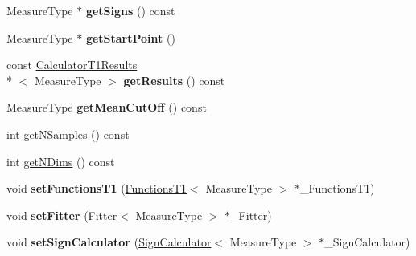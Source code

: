 \begin{DoxyCompactItemize}
\item 
\hypertarget{class_ox_1_1_calculator_t1_a1fb7d7a8ab324b807447a5757d8e20f9}{Measure\-Type $\ast$ {\bfseries get\-Signs} () const }\label{class_ox_1_1_calculator_t1_a1fb7d7a8ab324b807447a5757d8e20f9}

\item 
\hypertarget{class_ox_1_1_calculator_t1_a4d430a63b313f8ae1197a27842e87d47}{Measure\-Type $\ast$ {\bfseries get\-Start\-Point} ()}\label{class_ox_1_1_calculator_t1_a4d430a63b313f8ae1197a27842e87d47}

\item 
\hypertarget{class_ox_1_1_calculator_t1_a55406cd104fb7d67925ece789161e2c9}{const \hyperlink{struct_ox_1_1_calculator_t1_results}{Calculator\-T1\-Results}\\*
$<$ Measure\-Type $>$ {\bfseries get\-Results} () const }\label{class_ox_1_1_calculator_t1_a55406cd104fb7d67925ece789161e2c9}

\item 
\hypertarget{class_ox_1_1_calculator_t1_a3b66db06485b8031bcface5524d8c081}{Measure\-Type {\bfseries get\-Mean\-Cut\-Off} () const }\label{class_ox_1_1_calculator_t1_a3b66db06485b8031bcface5524d8c081}

\item 
int \hyperlink{class_ox_1_1_calculator_t1_a8a11b3b6c0dcbc461c11dc55600d7992}{get\-N\-Samples} () const 
\item 
int \hyperlink{class_ox_1_1_calculator_t1_a7523942a79b9ee44b2b5d81d5836b54d}{get\-N\-Dims} () const 
\item 
\hypertarget{class_ox_1_1_calculator_t1_a88e23f6ffa2903dc14a6133a90203f02}{void {\bfseries set\-Functions\-T1} (\hyperlink{class_ox_1_1_functions_t1}{Functions\-T1}$<$ Measure\-Type $>$ $\ast$\-\_\-\-Functions\-T1)}\label{class_ox_1_1_calculator_t1_a88e23f6ffa2903dc14a6133a90203f02}

\item 
\hypertarget{class_ox_1_1_calculator_t1_a106746ffcc08288c933c4dc210589f35}{void {\bfseries set\-Fitter} (\hyperlink{class_ox_1_1_fitter}{Fitter}$<$ Measure\-Type $>$ $\ast$\-\_\-\-Fitter)}\label{class_ox_1_1_calculator_t1_a106746ffcc08288c933c4dc210589f35}

\item 
\hypertarget{class_ox_1_1_calculator_t1_ae043a486f1db48e46a3e011e4a3d76b3}{void {\bfseries set\-Sign\-Calculator} (\hyperlink{class_ox_1_1_sign_calculator}{Sign\-Calculator}$<$ Measure\-Type $>$ $\ast$\-\_\-\-Sign\-Calculator)}\label{class_ox_1_1_calculator_t1_ae043a486f1db48e46a3e011e4a3d76b3}


\end{DoxyCompactItemize}
